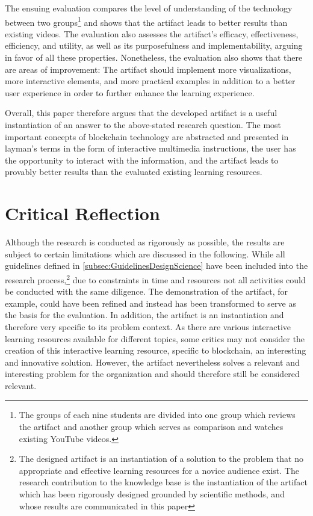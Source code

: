The ensuing evaluation compares the level of understanding of the technology between two groups\footnote{The groups of each nine students are divided into one group which reviews the artifact and another group which serves as comparison and watches existing YouTube videos.} and shows that the artifact leads to better results than existing videos. The evaluation also assesses the artifact's efficacy, effectiveness, efficiency, and utility, as well as its purposefulness and implementability, arguing in favor of all these properties. Nonetheless, the evaluation also shows that there are areas of improvement: The artifact should implement more visualizations, more interactive elements, and more practical examples in addition to a better user experience in order to further enhance the learning experience.

Overall, this paper therefore argues that the developed artifact is a useful instantiation of an answer to the above-stated research question. The most important concepts of blockchain technology are abstracted and presented in layman's terms in the form of interactive multimedia instructions, the user has the opportunity to interact with the information, and the artifact leads to provably better results than the evaluated existing learning resources.

\section{Critical Reflection} \label{sec:Reflection}
Although the research is conducted as rigorously as possible, the results are subject to certain limitations which are discussed in the following. 
While all guidelines defined in \ref{subsec:GuidelinesDesignScience} have been included into the research process,\footnote{The designed artifact is an instantiation of a solution to the problem that no appropriate and effective learning resources for a novice audience exist. The research contribution to the knowledge base is the instantiation of the artifact which has been rigorously designed grounded by scientific methods, and whose results are communicated in this paper} due to constraints in time and resources not all activities could be conducted with the same diligence. The demonstration of the artifact, for example, could have been refined and instead has been transformed to serve as the basis for the evaluation. In addition, the artifact is an instantiation and therefore very specific to its problem context. As there are various interactive learning resources available for different topics, some critics may not consider the creation of this interactive learning resource, specific to blockchain, an interesting and innovative solution. However, the artifact nevertheless solves a relevant and interesting problem for the organization and should therefore still be considered relevant. 


